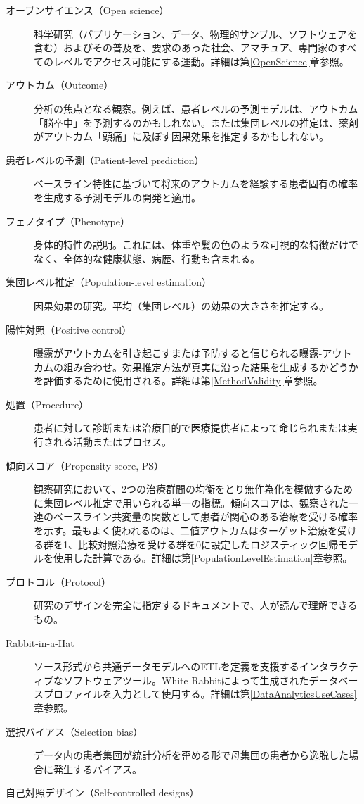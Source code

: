 \documentclass[
  11pt]{book}
\theoremstyle{definition}
\theoremstyle{definition}
\theoremstyle{definition}
\theoremstyle{definition}
\theoremstyle{remark}
\begin{document}
\begin{description}
\item[オープンサイエンス（Open science）]
科学研究（パブリケーション、データ、物理的サンプル、ソフトウェアを含む）およびその普及を、要求のあった社会、アマチュア、専門家のすべてのレベルでアクセス可能にする運動。詳細は第\ref{OpenScience}章参照。
\item[アウトカム（Outcome）]
分析の焦点となる観察。例えば、患者レベルの予測モデルは、アウトカム「脳卒中」を予測するのかもしれない。または集団レベルの推定は、薬剤がアウトカム「頭痛」に及ぼす因果効果を推定するかもしれない。
\item[患者レベルの予測（Patient-level prediction）]
ベースライン特性に基づいて将来のアウトカムを経験する患者固有の確率を生成する予測モデルの開発と適用。
\item[フェノタイプ（Phenotype）]
身体的特性の説明。これには、体重や髪の色のような可視的な特徴だけでなく、全体的な健康状態、病歴、行動も含まれる。
\item[集団レベル推定（Population-level estimation）]
因果効果の研究。平均（集団レベル）の効果の大きさを推定する。
\item[陽性対照（Positive control）]
曝露がアウトカムを引き起こすまたは予防すると信じられる曝露-アウトカムの組み合わせ。効果推定方法が真実に沿った結果を生成するかどうかを評価するために使用される。詳細は第\ref{MethodValidity}章参照。
\item[処置（Procedure）]
患者に対して診断または治療目的で医療提供者によって命じられまたは実行される活動またはプロセス。
\item[傾向スコア（Propensity score, PS）]
観察研究において、2つの治療群間の均衡をとり無作為化を模倣するために集団レベル推定で用いられる単一の指標。傾向スコアは、観察された一連のベースライン共変量の関数として患者が関心のある治療を受ける確率を示す。最もよく使われるのは、二値アウトカムはターゲット治療を受ける群を1、比較対照治療を受ける群を0に設定したロジスティック回帰モデルを使用した計算である。詳細は第\ref{PopulationLevelEstimation}章参照。
\item[プロトコル（Protocol）]
研究のデザインを完全に指定するドキュメントで、人が読んで理解できるもの。
\item[Rabbit-in-a-Hat]
ソース形式から共通データモデルへのETLを定義を支援するインタラクティブなソフトウェアツール。White Rabbitによって生成されたデータベースプロファイルを入力として使用する。詳細は第\ref{DataAnalyticsUseCases}章参照。
\item[選択バイアス（Selection bias）]
データ内の患者集団が統計分析を歪める形で母集団の患者から逸脱した場合に発生するバイアス。
\item[自己対照デザイン（Self-controlled designs）]

\end{description}
\end{document}

